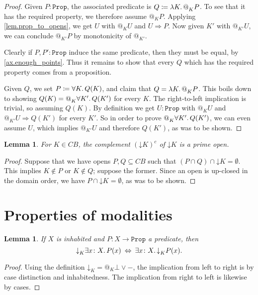 \documentclass[11pt, oneside, article]{memoir}
\makeatletter
\theoremstyle{plain}
\newtheorem{lemma}[theorem]{Lemma}
\theoremstyle{definition}
\theoremstyle{remark}
\newcommand{\const}[1]{\mathtt{#1}}
\newcommand{\Prop}{\const{Prop}}
\newcommand{\BaseSpace}{B}
\newcommand{\AtSymbol}{{@}}
\newcommand{\SeeSymbol}{{\down}}  %
\newcommand{\At}[2][]{\AtSymbol^{#1}_{#2}}
\newcommand{\See}[2][]{\SeeSymbol^{#1}_{#2}}
\newcommand{\down}{\mathord{\downarrow}}
\newcommand{\imp}{\Rightarrow}
\makeatother
\begin{document}
\begin{proof}
Given $P : \Prop$, the associated predicate is $Q \coloneqq \lambda K \ldotp \At{K} P$. To see that it has the required property, we therefore assume $\At{K} P$. Applying \cref{lem.prop_to_opens}, we get $U$ with $\At{K} U$ and $U \imp P$. Now given $K'$ with $\At{K'} U$, we can conclude $\At{K'} P$ by monotonicity of $\At{K'}$.

Clearly if $P, P' : \Prop$ induce the same predicate, then they must be equal, by \cref{ax.enough_points}. Thus it remains to show that every $Q$ which has the required property comes from a proposition.

Given $Q$, we set $P \coloneqq \forall K \ldotp Q(K)$, and claim that $Q = \lambda K \ldotp \At{K} P$. This boils down to showing $Q(K) = \At{K} \forall K' \ldotp Q(K')$ for every $K$. The right-to-left implication is trivial, so assuming $Q(K)$. By definition we get $U : \Prop$ with $\At{K} U$ and $\At{K'} U \imp Q(K')$ for every $K'$. So in order to prove $\At{K} \forall K' \ldotp Q(K')$, we can even assume $U$, which implies $\At{K'} U$ and therefore $Q(K')$, as was to be shown.
\end{proof}

\begin{lemma}
For $K\in C\BaseSpace$, the complement $(\down K)^c$ of $\down K$ is a prime open.
\label{lem.prime}
\end{lemma}

\begin{proof}
Suppose that we have opens $P,Q\subseteq C\BaseSpace$ such that $(P\cap Q)\cap \down K = \emptyset$. This implies $K\not\in P$ or $K\not\in Q$; suppose the former. Since an open is up-closed in the domain order, we have $P\cap \down K = \emptyset$, as was to be shown.
\end{proof}


\section{Properties of modalities}

\begin{lemma}
If $X$ is inhabited and $P : X \to \Prop$ a predicate, then
\[
	\See{K} \exists x \colon X \ldotp P(x) \: \Leftrightarrow \: \exists x \colon X \ldotp \See{K} P(x).
\]
\label{lem.see_vs_exists}
\end{lemma}

\begin{proof}
Using the definition $\See{K} = \At{K} \bot \vee -$, the implication from left to right is by case distinction and inhabitedness. The implication from right to left is likewise by cases.
\end{proof}
\end{document}
